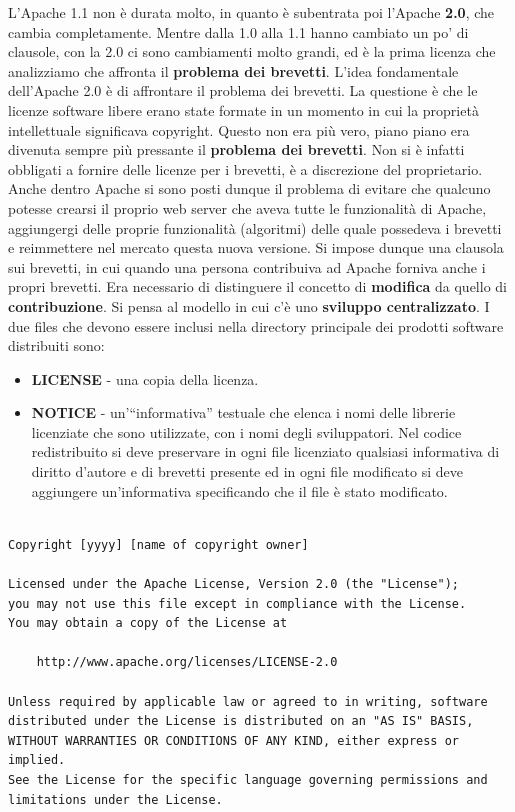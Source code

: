 L'Apache 1.1 non è durata molto, in quanto è subentrata poi l'Apache \textbf{2.0}, che cambia completamente. Mentre dalla 1.0 alla 1.1 hanno cambiato un po' di clausole, con la 2.0 ci sono cambiamenti molto grandi, ed è la prima licenza che analizziamo che affronta il \textbf{problema dei brevetti}. L'idea fondamentale dell'Apache 2.0 è di affrontare il problema dei brevetti. La questione è che le licenze software libere erano state formate in un momento in cui la proprietà intellettuale significava copyright. Questo non era più vero, piano piano era divenuta sempre più pressante il \textbf{problema dei brevetti}. Non si è infatti obbligati a fornire delle licenze per i brevetti, è a discrezione del proprietario. Anche dentro Apache si sono posti dunque il problema di evitare che qualcuno potesse crearsi il proprio web server che aveva tutte le funzionalità di Apache, aggiungergi delle proprie funzionalità (algoritmi) delle quale possedeva i brevetti e reimmettere nel mercato questa nuova versione. Si impose dunque una clausola sui brevetti, in cui quando una persona contribuiva ad Apache forniva anche i propri brevetti. Era necessario di distinguere il concetto di \textbf{modifica} da quello di \textbf{contribuzione}. Si pensa al modello in cui c'è uno \textbf{sviluppo centralizzato}.	
\linebreak
\linebreak
I due files che devono essere inclusi nella directory principale dei prodotti software distribuiti sono:

\begin{itemize}

\item \textbf{LICENSE} - una copia della licenza.
\item \textbf{NOTICE} - un'``informativa'' testuale che elenca i nomi delle librerie licenziate che sono utilizzate, con i nomi degli sviluppatori. Nel codice redistribuito si deve preservare in ogni file licenziato qualsiasi informativa di diritto d'autore e di brevetti presente ed in ogni file modificato si deve aggiungere un'informativa specificando che il file è stato modificato.

\end{itemize}

\begin{lstlisting}[caption=licenza Apache 2.0]

Copyright [yyyy] [name of copyright owner]

Licensed under the Apache License, Version 2.0 (the "License");
you may not use this file except in compliance with the License.
You may obtain a copy of the License at

    http://www.apache.org/licenses/LICENSE-2.0

Unless required by applicable law or agreed to in writing, software
distributed under the License is distributed on an "AS IS" BASIS,
WITHOUT WARRANTIES OR CONDITIONS OF ANY KIND, either express or implied.
See the License for the specific language governing permissions and
limitations under the License.

\end{lstlisting}

